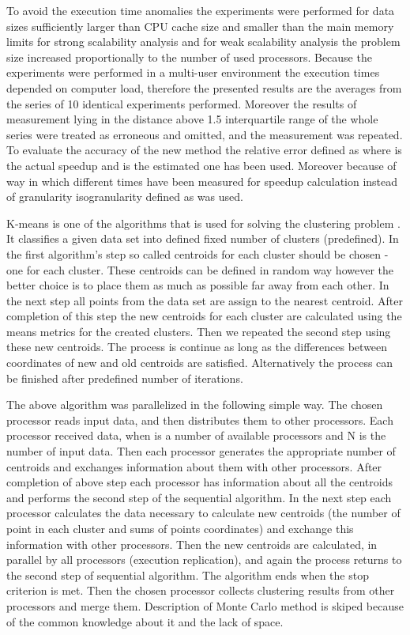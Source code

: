 \documentclass[runningheads]{llncs}
\begin{document}
To avoid the execution time anomalies \cite{kwiatkowski_2} the experiments were performed for data sizes
sufficiently larger than CPU cache size and smaller than the main memory limits for strong scalability analysis and for weak scalability analysis the problem size increased proportionally to the number of used processors. Because the experiments were performed in a multi-user environment the execution times depended on computer load, therefore the presented results are the averages from the series of 10 identical experiments performed. Moreover the results of measurement lying in the distance above 1.5 interquartile range of the whole series were treated as erroneous and omitted, and the measurement was repeated. To evaluate the accuracy of the new method the relative error defined as  where  is the actual speedup and  is the estimated one has been used. Moreover because of way in which different times have been measured for speedup calculation instead of granularity isogranularity defined as  was used. 

K-means is one of the algorithms that is used for solving the clustering problem \cite{macqueen}. It classifies a given data set into defined fixed number of clusters  (predefined). In the first algorithm's step so called centroids for each cluster should be chosen - one for each cluster. These centroids can be defined in random way however the better choice is to place them as much as possible far away from each other. In the next step all points from the data set are assign to the nearest centroid. After completion of this step the new centroids for each cluster are calculated using the means metrics for the created clusters. Then we repeated the second step using these new centroids. The process is continue as long as the differences between coordinates of new and old centroids are satisfied. Alternatively the process can be finished after predefined number of iterations. 

The above algorithm was parallelized in the following simple way. The chosen processor reads input data, and then distributes them to other processors. Each processor received   data, when  is a number of available processors and N is the number of input data. Then each processor generates the appropriate number of centroids and exchanges information about them with other processors. After completion of above step each processor has information about all the centroids and performs the second step of the sequential algorithm. In the next step each processor calculates the data necessary to calculate new centroids (the number of point in each cluster and sums of points coordinates) and exchange this information with other processors. Then the new centroids are calculated, in parallel by all processors  (execution replication), and again the process returns to the second step of sequential algorithm. The algorithm ends when the stop criterion is met. Then the chosen processor collects clustering results from other processors and merge them. Description of Monte Carlo method is skiped because of the common knowledge about it and the lack of space. 
\end{document}
